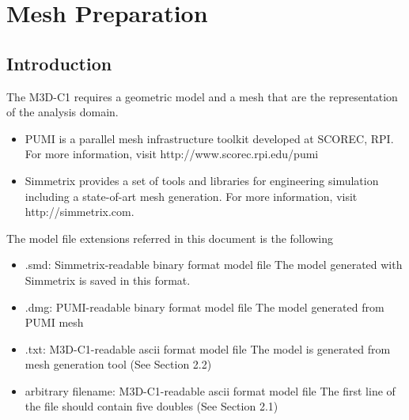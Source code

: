 \chapter{Mesh Preparation}
\section{Introduction}

The M3D-C1 requires a geometric model and a mesh that are the representation of the analysis domain. 
\begin{itemize}
\item PUMI is a parallel mesh infrastructure toolkit developed at SCOREC, RPI. For more information, visit http://www.scorec.rpi.edu/pumi
\item	Simmetrix provides a set of tools and libraries for engineering simulation including a state-of-art mesh generation. For more information, visit http://simmetrix.com.
\end{itemize}

The model file extensions referred in this document is the following
\begin{itemize}
\item .smd: Simmetrix-readable binary format model file  
\newline  The model generated with Simmetrix is saved in this format.
\item .dmg: PUMI-readable binary format model file
\newline	The model generated from PUMI mesh
\item	.txt: M3D-C1-readable ascii format model file 
\newline	The model is generated from mesh generation tool (See Section 2.2)
\item	arbitrary filename: M3D-C1-readable ascii format model file 
\newline  The first line of the file should contain five doubles (See Section 2.1)
\end{itemize}

